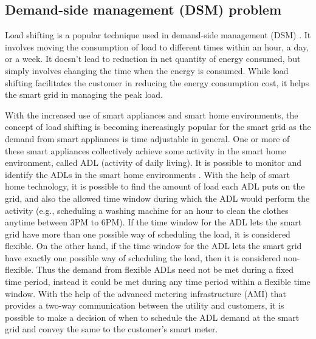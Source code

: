 
\subsection{Demand-side management (DSM) problem}
Load shifting is a popular technique used in demand-side management (DSM) \cite{DTU2010}. It involves moving the consumption of load to different times within an hour,  a day, or  a week. It doesn't lead to reduction in net quantity of energy consumed, but simply involves changing the time when the energy is consumed. While load shifting facilitates the customer in reducing the energy consumption cost, it helps the smart grid in managing the peak load.

With the increased use of smart appliances and smart home environments, the concept of load shifting is becoming increasingly popular for the smart grid as the demand from smart appliances is time adjustable in general. One or more of these smart appliances collectively achieve some activity in the smart home environment, called ADL (activity of daily living). It is possible to monitor and identify the ADLs in the smart home environments \cite{GPG2016}.%
  With the help of smart home technology, it is possible to find the amount of load each ADL puts on the grid, and also the allowed time window during which the ADL would perform the activity (e.g., scheduling a  washing machine for an hour to clean the clothes anytime between 3PM to 6PM).  If the time window for the ADL lets the smart grid have more than one possible way of scheduling the load, it is considered  flexible. On the other hand, if the time window for the ADL lets the smart grid have exactly one possible way of scheduling the load, then it is  considered  non-flexible.
 Thus the demand from  flexible ADLs need not be met during a fixed time period, instead it could be met during any time period within a flexible time window. With the help of the advanced metering infrastructure (AMI) that provides a two-way communication between the utility and customers, it is possible to make a decision of when to schedule the ADL demand at the smart grid and convey the same to the customer's smart meter. 

